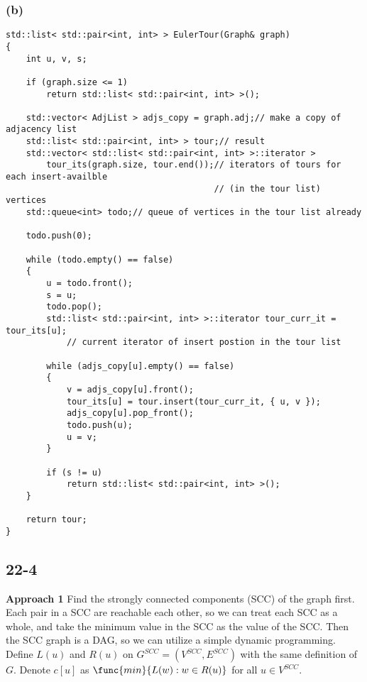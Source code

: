 \subsubsection*{(b)}

\begin{verbatim}
std::list< std::pair<int, int> > EulerTour(Graph& graph)
{
    int u, v, s;

    if (graph.size <= 1)
        return std::list< std::pair<int, int> >();

    std::vector< AdjList > adjs_copy = graph.adj;// make a copy of adjacency list
    std::list< std::pair<int, int> > tour;// result
    std::vector< std::list< std::pair<int, int> >::iterator > 
        tour_its(graph.size, tour.end());// iterators of tours for each insert-availble 
                                         // (in the tour list) vertices
    std::queue<int> todo;// queue of vertices in the tour list already
    
    todo.push(0);

    while (todo.empty() == false)
    {
        u = todo.front();
        s = u;
        todo.pop();
        std::list< std::pair<int, int> >::iterator tour_curr_it = tour_its[u];
            // current iterator of insert postion in the tour list

        while (adjs_copy[u].empty() == false)
        {
            v = adjs_copy[u].front();
            tour_its[u] = tour.insert(tour_curr_it, { u, v });
            adjs_copy[u].pop_front();
            todo.push(u);
            u = v;
        }

        if (s != u)
            return std::list< std::pair<int, int> >();
    }

    return tour;
}
\end{verbatim}

\subsection*{22-4}

\textbf{Approach 1}
Find the strongly connected components (SCC) of the graph first.
Each pair in a SCC are reachable each other,
so we can treat each SCC as a whole, and take the minimum value in the SCC
as the value of the SCC.
Then the SCC graph is a DAG, 
so we can utilize a simple dynamic programming.
Define $L(u)$ and $R(u)$ on $G^{SCC} = (V^{SCC}, E^{SCC})$ 
with the same definition of $G$.
Denote $c[u]$ as $\func{min} \{ L(w) : w \in R(u) \}$ 
for all $u \in V^{SCC}$.

